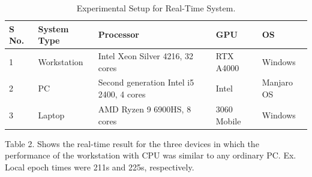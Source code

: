 \documentclass[conference]{IEEEtran}
\begin{document}
\begin{table}[htp]
\centering
\caption{Experimental Setup for Real-Time System.}
\begin{adjustbox}{max width=9cm}

\begin{tabular}{|l|l|l|l|l|}
\hline
S No. & System Type & Processor                                & GPU         & OS         \\ \hline
1     & Workstation & Intel Xeon Silver 4216, 32 cores         & RTX A4000   & Windows    \\ \hline
2     & PC          & Second generation Intel i5 2400, 4 cores & Intel       & Manjaro OS \\ \hline
3     & Laptop      & AMD Ryzen 9 6900HS, 8 cores              & 3060 Mobile & Windows    \\ \hline
\end{tabular}
\end{adjustbox}

\end{table}
Table 2. Shows the real-time result for the three devices in which the performance of the workstation with CPU was similar to any ordinary PC. Ex. Local epoch times were 211s and 225s, respectively. 
\end{document}
